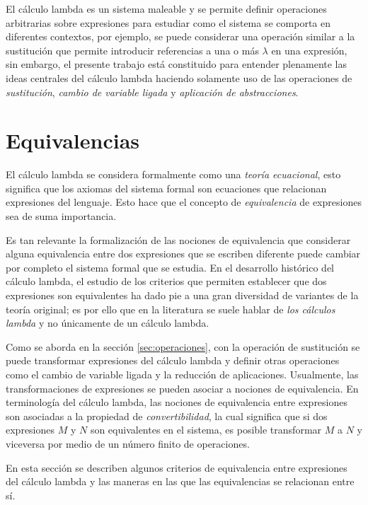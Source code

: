 El cálculo lambda es un sistema maleable y se permite definir operaciones arbitrarias sobre expresiones para estudiar como el sistema se comporta en diferentes contextos, por ejemplo, se puede considerar una operación similar a la sustitución que permite introducir referencias a una o más \( λ \) en una expresión, sin embargo, el presente trabajo está constituido para entender plenamente las ideas centrales del cálculo lambda haciendo solamente uso de las operaciones de \emph{sustitución}, \emph{cambio de variable ligada} y \emph{aplicación de abstracciones}.

\section{Equivalencias}
\label{sec:equivalencias}

El cálculo lambda se considera formalmente como una \emph{teoría ecuacional}, esto significa que los axiomas del sistema formal son ecuaciones que relacionan expresiones del lenguaje. Esto hace que el concepto de \emph{equivalencia} de expresiones sea de suma importancia.

Es tan relevante la formalización de las nociones de equivalencia que considerar alguna equivalencia entre dos expresiones que se escriben diferente puede cambiar por completo el sistema formal que se estudia. En el desarrollo histórico del cálculo lambda, el estudio de los criterios que permiten establecer que dos expresiones son equivalentes ha dado pie a una gran diversidad de variantes de la teoría original; es por ello que en la literatura se suele hablar de \emph{los cálculos lambda} y no únicamente de un cálculo lambda.

Como se aborda en la sección \ref{sec:operaciones}, con la operación de sustitución se puede transformar expresiones del cálculo lambda y definir otras operaciones como el cambio de variable ligada y la reducción de aplicaciones. Usualmente, las transformaciones de expresiones se pueden asociar a nociones de equivalencia. En terminología del cálculo lambda, las nociones de equivalencia entre expresiones son asociadas a la propiedad de \emph{convertibilidad}, la cual significa que si dos expresiones \( M \) y \( N \) son equivalentes en el sistema, es posible transformar \( M \) a \( N \) y viceversa por medio de un número finito de operaciones.

En esta sección se describen algunos criterios de equivalencia entre expresiones del cálculo lambda y las maneras en las que las equivalencias se relacionan entre sí.


